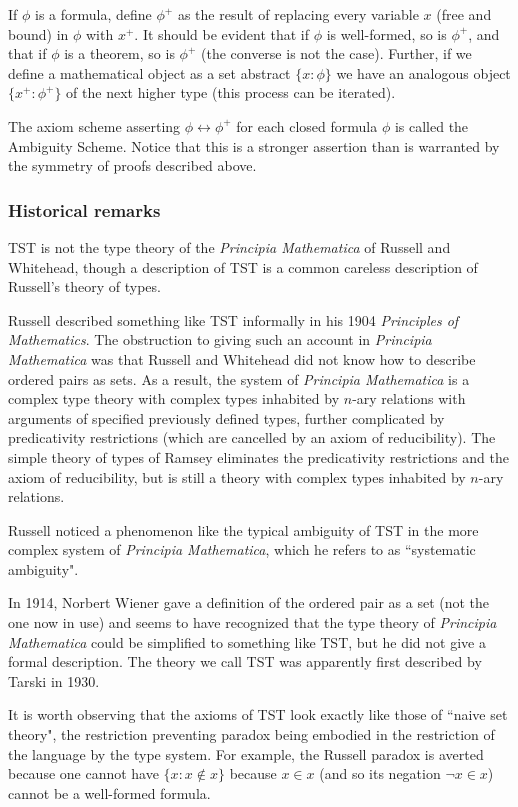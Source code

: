 \documentclass[12pt]{article}
\begin{document}
If $\phi$ is a formula, define $\phi^+$ as the result of replacing every variable $x$ (free and bound) in $\phi$ with $x^+$.  It should be evident that if $\phi$ is well-formed, so is $\phi^+$,
and that if $\phi$ is a theorem, so is $\phi^+$ (the converse is not the case).  Further, if we define a mathematical object as a set abstract $\{x:\phi\}$ we have an analogous
object $\{x^+:\phi^+\}$ of the next higher type (this process can be iterated).

The axiom scheme asserting $\phi \leftrightarrow \phi^+$ for each closed formula $\phi$ is called the Ambiguity Scheme.   Notice that this is a stronger assertion than is warranted by the symmetry of proofs described above.

\subsubsection{Historical remarks}

TST is not the type theory of the {\em Principia Mathematica\/} of Russell and Whitehead, though a description of TST is a common careless description of Russell's theory of types.

Russell described something like TST informally in his 1904 {\em Principles of Mathematics\/}.  The obstruction to giving such an account in {\em Principia Mathematica\/} was that
Russell and Whitehead did not know how to describe ordered pairs as sets.  As a result, the system of {\em Principia Mathematica\/} is a complex type theory with complex
types inhabited by $n$-ary relations with arguments of specified previously defined types, further complicated by predicativity restrictions (which are cancelled by an axiom of reducibility).
The simple theory of types of Ramsey eliminates the predicativity restrictions and the axiom of reducibility, but is still a theory with complex types inhabited by $n$-ary relations.

Russell noticed a phenomenon like the typical ambiguity of TST in the more complex system of {\em Principia Mathematica\/}, which he refers to as ``systematic ambiguity".

In 1914, Norbert Wiener gave a definition of the ordered pair as a set (not the one now in use) and seems to have recognized that the type theory of {\em Principia Mathematica\/} could be simplified to something like TST, but he did not give a formal description.  The theory we call TST was apparently first described by Tarski in 1930.

It is worth observing that the axioms of TST look exactly like those of ``naive set theory", the restriction preventing paradox being embodied in the restriction of the language by the type system.
For example, the Russell paradox is averted because one cannot have $\{x:x \not\in x\}$ because $x \in x$ (and so its negation $\neg x \in x$) cannot be a well-formed formula.
\end{document}
